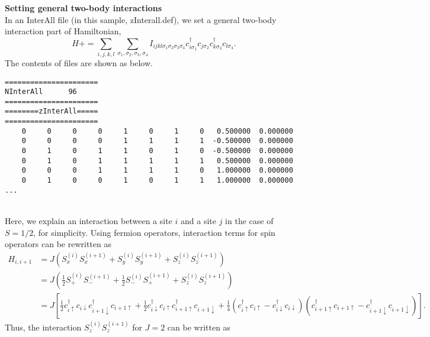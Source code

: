 \begin{description}
\item {\bf Setting general two-body interactions}\\
In an InterAll file (in this sample, zInterall.def), we set a general two-body interaction part of Hamiltonian,
\begin{equation}
H+=\sum_{i,j,k,l}\sum_{\sigma_1,\sigma_2, \sigma_3, \sigma_4}
I_{ijkl\sigma_1\sigma_2\sigma_3\sigma_4}c_{i\sigma_1}^{\dagger}c_{j\sigma_2}c_{k\sigma_3}^{\dagger}c_{l\sigma_4}.
\end{equation}
The contents of files are shown as below.\\
\begin{minipage}{16cm}
\begin{screen}
\begin{verbatim}
====================== 
NInterAll      96  
====================== 
========zInterAll===== 
====================== 
    0     0     0     0     1     0     1     0   0.500000  0.000000
    0     0     0     0     1     1     1     1  -0.500000  0.000000
    0     1     0     1     1     0     1     0  -0.500000  0.000000
    0     1     0     1     1     1     1     1   0.500000  0.000000
    0     0     0     1     1     1     1     0   1.000000  0.000000
    0     1     0     0     1     0     1     1   1.000000  0.000000
...
\end{verbatim}
\end{screen}
\end{minipage}
~\\
Here, we explain an interaction between a site $i$ and a site $j$ {in the case of $S=1/2$}, for simplicity. Using fermion operators, interaction terms for spin operators can be rewritten as
\begin{align}
H_{i,i+1}&=J(S_x^{(i)}S_x^{(i+1)}+S_y^{(i)}S_y^{(i+1)}+S_z^{(i)}S_z^{(i+1)}) \nonumber\\
&=J \left( \frac{1}{2}S_+^{(i)}S_-^{(i+1)}+\frac{1}{2}S_-^{(i)}S_+^{(i+1)}+S_z^{(i)}S_z^{(i+1)} \right) \nonumber\\
&=J \left[ \frac{1}{2}c_{i\uparrow}^{\dag}c_{i\downarrow}c_{i+1\downarrow}^{\dag}c_{i+1\uparrow}+\frac{1}{2}c_{i\downarrow}^{\dag}c_{i\uparrow}c_{i+1\uparrow}^{\dag}c_{i+1\downarrow}+\frac{1}{4}(c_{i\uparrow}^{\dag}c_{i\uparrow}-c_{i\downarrow}^{\dag}c_{i\downarrow})(c_{i+1\uparrow}^{\dag}c_{i+1\uparrow}-c_{i+1\downarrow}^{\dag}c_{i+1\downarrow}) \right]. \nonumber 
\end{align}
Thus, the interaction $S_z^{(i)}S_z^{(i+1)}$ for $J=2$ can be written as \\
\begin{minipage}{16cm}

\end{minipage}
\end{description}
